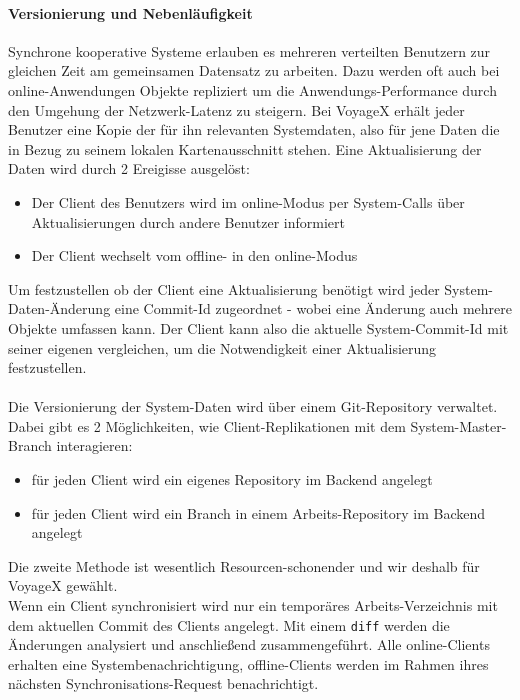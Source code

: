 \paragraph{Versionierung und Nebenläufigkeit}
Synchrone kooperative Systeme erlauben es mehreren verteilten Benutzern zur gleichen Zeit am gemeinsamen Datensatz zu arbeiten. Dazu werden oft auch bei online-Anwendungen Objekte repliziert um die Anwendungs-Performance durch den Umgehung der Netzwerk-Latenz zu steigern. Bei VoyageX erhält jeder Benutzer
eine Kopie der für ihn relevanten Systemdaten, also für jene Daten die in Bezug zu seinem lokalen Kartenausschnitt stehen. Eine Aktualisierung der Daten wird durch 2 Ereigisse ausgelöst:
\begin{itemize}[leftmargin=*,noitemsep,topsep=1ex,parsep=0pt,partopsep=0pt]
\item Der Client des Benutzers wird im online-Modus per System-Calls über Aktualisierungen durch andere Benutzer informiert
\item  Der Client wechselt vom offline- in den online-Modus
\end{itemize}
Um festzustellen ob der Client eine Aktualisierung benötigt wird jeder System-Daten-Änderung eine Commit-Id zugeordnet - wobei eine Änderung auch mehrere Objekte umfassen kann. Der Client kann also die aktuelle System-Commit-Id mit seiner eigenen vergleichen, um die Notwendigkeit einer Aktualisierung festzustellen.\\ \\ 
Die Versionierung der System-Daten wird über einem Git-Repository verwaltet. Dabei gibt es 2 Möglichkeiten, wie Client-Replikationen mit dem System-Master-Branch interagieren:
\begin{itemize}[leftmargin=*,noitemsep,topsep=1ex,parsep=0pt,partopsep=0pt]
\item für jeden Client wird ein eigenes Repository im Backend angelegt
\item für jeden Client wird ein Branch in einem Arbeits-Repository im Backend angelegt
\end{itemize}
Die zweite Methode ist wesentlich Resourcen-schonender und wir deshalb für VoyageX gewählt.\\
Wenn ein Client synchronisiert wird nur ein temporäres Arbeits-Verzeichnis mit dem aktuellen Commit des Clients angelegt. Mit einem \texttt{diff} werden die Änderungen analysiert und anschließend zusammengeführt.
Alle online-Clients erhalten eine Systembenachrichtigung, offline-Clients werden im Rahmen ihres nächsten Synchronisations-Request benachrichtigt.

